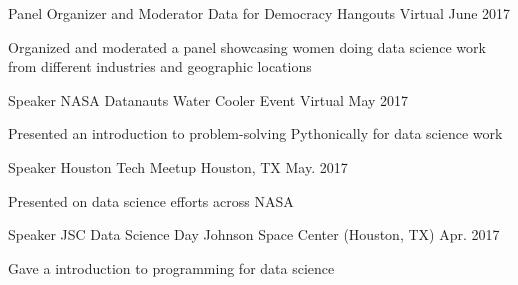 

\begin{cventries}

  \cventry
    {Panel Organizer and Moderator} %
    {Data for Democracy Hangouts} %
    {Virtual} %
    {June 2017} %
    {
      \begin{cvitems} %
        \item {Organized and moderated a panel showcasing women doing data science work from different industries and geographic locations}
      \end{cvitems}
    }
    
  \cventry
    {Speaker} %
    {NASA Datanauts Water Cooler Event} %
    {Virtual} %
    {May 2017} %
    {
      \begin{cvitems} %
        \item {Presented an introduction to problem-solving Pythonically for data science work}
      \end{cvitems}
    }
    
    
  \cventry
    {Speaker} %
    {Houston Tech Meetup} %
    {Houston, TX} %
    {May. 2017} %
    {
      \begin{cvitems} %
        \item {Presented on data science efforts across NASA}
      \end{cvitems}
    }

  \cventry
    {Speaker} %
    {JSC Data Science Day} %
    {Johnson Space Center (Houston, TX)} %
    {Apr. 2017} %
    {
      \begin{cvitems} %
        \item {Gave a introduction to programming for data science}
      \end{cvitems}
    }


\end{cventries}
